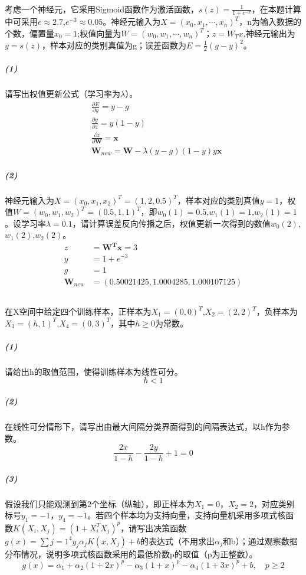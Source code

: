 \documentclass[UTF8]{ctexart}
\begin{document}
\paragraph{}
考虑一个神经元，它采用Sigmoid函数作为激活函数，$s(z)=\frac{1}{1+e^{-x}}$，在本题计算中可采用$e\approx 2.7$,$e^{-3}\approx 0.05$。神经元输入为$X=(x_0,x_1,\cdots,x_n)^T$，n为输入数据的个数，偏置量$x_0=1$;权值向量为$W=(w_0,w_1,\cdots,w_n)^T$；$z=W_Tx$,神经元输出为$y=s(z)$，样本对应的类别真值为g；误差函数为$E=\frac{1}{2}(g-y)^2$。
\subparagraph{(1)}
请写出权值更新公式（学习率为$\lambda$）。
\begin{equation*}
\begin{aligned}
&\frac{\partial E}{\partial y}=y-g \\
&\frac{\partial y}{\partial z}=y(1-y) \\
&\frac{\partial z}{\partial \boldsymbol W}=\boldsymbol x \\
&\boldsymbol W_{new} = \boldsymbol W -\lambda (y-g)(1-y)y\boldsymbol x
\end{aligned}
\end{equation*}
\subparagraph{(2)}
神经元输入为$X=(x_0,x_1,x_2)^T=(1,2,0.5)^T$，样本对应的类别真值$y=1$，权值$W=(w_0,w_1,w_2)^T=(0.5,1,1)^T$，即$w_0(1)=0.5$,$w_1(1)=1$,$w_2(1)=1$。设学习率$\lambda =0.1$，请计算误差反向传播之后，权值更新一次得到的数值$w_0(2)$,$w_1(2)$,$w_2(2)$。
\begin{equation*}
\begin{aligned}
z&=\boldsymbol {W^Tx} =3\\
y&=1+e^{-3}\\
g&=1\\
\boldsymbol W_{new} &=(0.50021425,1.0004285,1.000107125)
\end{aligned}
\end{equation*}
\subsection{}
\paragraph{}
在X空间中给定四个训练样本，正样本为$X_1=(0,0)^T$,$X_2=(2,2)^T$，负样本为$X_3=(h,1)^T$,$X_4=(0,3)^T$，其中$h\geq 0$为常数。
\subparagraph{(1)}
请给出h的取值范围，使得训练样本为线性可分。
\[h<1\]
\subparagraph{(2)}
在线性可分情形下，请写出由最大间隔分类界面得到的间隔表达式，以h作为参数。
\[\frac{2x}{1-h}-\frac{2y}{1-h}+1=0\]
\subparagraph{(3)}
假设我们只能观测到第2个坐标（纵轴），即正样本为$X_1=0$，$X_2=2$，对应类别标号$y_1=-1$，$y_4=-1$。若四个样本均为支持向量，支持向量机采用多项式核函数$K(X_i,X_j)=(1+X_i^TX_j)^p$，请写出决策函数$g(x)=\sum{j=1}^4{y_j\alpha_jK(x,X_j)+b}$的表达式（不用求出$\alpha_j$和b）；通过观察数据分布情况，说明多项式核函数采用的最低阶数p的取值（p为正整数）。
\[
g(x)=\alpha_1+\alpha_2(1+2x)^p-\alpha_3(1+x)^p-\alpha_4(1+3x)^p+b, \quad p\geq 2
\]
\end{document}
